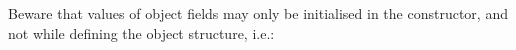 Beware that values of object fields may only be initialised in the 
  constructor, and not while defining the object structure, i.e.:
